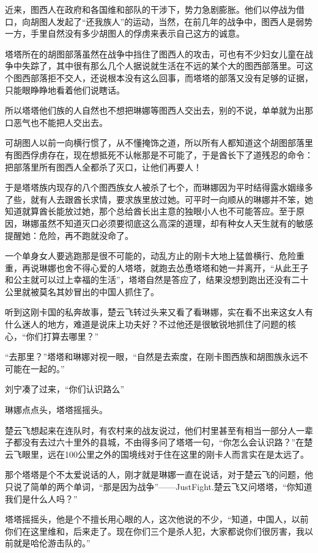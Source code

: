 近来，图西人在政府和各国维和部队的干涉下，势力急剧膨胀。他们以停战为借口，向胡图人发起了“还我族人”的运动，当然，在前几年的战争中，图西人是弱势一方，手里自然没有多少胡图人的俘虏来表示自己这方的诚意。

塔塔所在的胡图部落虽然在战争中挡住了图西人的攻击，可也有不少妇女儿童在战争中失踪了，其中很有那么几个人据说就生活在不远的某个大的图西部落里。可这个图西部落拒不交人，还说根本没有这么回事，而塔塔的部落又没有足够的证据，只能眼睁睁地看着他们说瞎话。

所以塔塔他们族的人自然也不想把琳娜等图西人交出去，别的不说，单单就为出那口恶气也不能把人交出去。

可胡图人以前一向横行惯了，从不懂掩饰之道，所以所有人都知道这个胡图部落里有图西俘虏存在，现在想抵死不认帐那是不可能了，于是酋长下了道残忍的命令：把部落里所有图西人全都杀了灭口，让他们再要人！

于是塔塔族内现存的八个图西族女人被杀了七个，而琳娜因为平时结得露水姻缘多了些，就有人去跟酋长求情，要求族里放过她。可平时一向顺从的琳娜并不笨，她知道就算酋长能放过她，那个总给酋长出主意的独眼小人也不可能答应。至于原因，琳娜虽然不知道灭口必须要彻底这么高深的道理，却有种女人天生就有的敏感提醒她：危险，再不跑就没命了。

一个单身女人要逃跑那是很不可能的，动乱方止的刚卡大地上猛兽横行、危险重重，再说琳娜也舍不得心爱的人塔塔，就跑去怂恿塔塔和她一并离开，“从此王子和公主就可以过上幸福的生活”，塔塔自然是答应了，结果没想到跑出还没有二十公里就被莫名其妙冒出的中国人抓住了。

听到这刚卡国的私奔故事，楚云飞转过头来又看了看琳娜，实在看不出来这女人有什么迷人的地方，难道是说床上功夫好？不过他还是很敏锐地抓住了问题的核心，“你们打算去哪里？”

“去那里？”塔塔和琳娜对视一眼，“自然是去索度，在刚卡图西族和胡图族永远不可能在一起的。”

刘宁凑了过来，“你们认识路么”

琳娜点点头，塔塔摇摇头。

楚云飞想起来在连队时，有农村来的战友说过，他们村里甚至有相当一部分人一辈子都没有去过六十里外的县城，不由得多问了塔塔一句，“你怎么会认识路？”在楚云飞眼里，远在100公里之外的国境线对于住在这里的刚卡人而言实在是太远了。

那个塔塔是个不太爱说话的人，刚才就是琳娜一直在说话，对于楚云飞的问题，他只说了简单的两个单词，“那是因为战争”——JustFight.楚云飞又问塔塔，“你知道我们是什么人吗？”

塔塔摇摇头，他是个不擅长用心眼的人，这次他说的不少，“知道，中国人，以前你们在这里维和，后来走了。现在你们三个是杀人犯，大家都说你们很厉害，我以前就是哈伦游击队的。”

